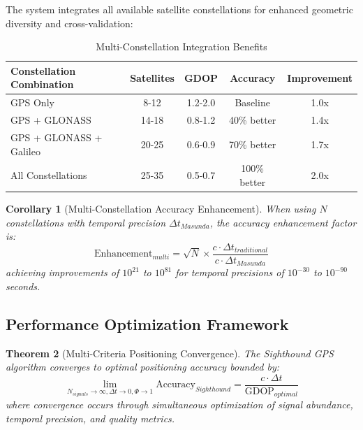 \documentclass[12pt,a4paper]{article}
\newtheorem{theorem}{Theorem}[section]
\newtheorem{corollary}[theorem]{Corollary}
\begin{document}
The system integrates all available satellite constellations for enhanced geometric diversity and cross-validation:

\begin{table}[htbp]
\centering
\caption{Multi-Constellation Integration Benefits}
\begin{tabular}{@{}lcccc@{}}
\toprule
\textbf{Constellation Combination} & \textbf{Satellites} & \textbf{GDOP} & \textbf{Accuracy} & \textbf{Improvement} \\
\midrule
GPS Only & 8-12 & 1.2-2.0 & Baseline & 1.0x \\
GPS + GLONASS & 14-18 & 0.8-1.2 & 40\% better & 1.4x \\
GPS + GLONASS + Galileo & 20-25 & 0.6-0.9 & 70\% better & 1.7x \\
All Constellations & 25-35 & 0.5-0.7 & 100\% better & 2.0x \\
\bottomrule
\end{tabular}
\end{table}

\begin{corollary}[Multi-Constellation Accuracy Enhancement]
When using $N$ constellations with temporal precision $\Delta t_{Masunda}$, the accuracy enhancement factor is:
\begin{equation}
\text{Enhancement}_{multi} = \sqrt{N} \times \frac{c \cdot \Delta t_{traditional}}{c \cdot \Delta t_{Masunda}}
\end{equation}
achieving improvements of $10^{21}$ to $10^{81}$ for temporal precisions of $10^{-30}$ to $10^{-90}$ seconds.
\end{corollary}


\subsection{Performance Optimization Framework}

\begin{theorem}[Multi-Criteria Positioning Convergence]
The Sighthound GPS algorithm converges to optimal positioning accuracy bounded by:
\begin{equation}
\lim_{N_{signals} \to \infty, \Delta t \to 0, \Phi \to 1} \text{Accuracy}_{Sighthound} = \frac{c \cdot \Delta t}{\text{GDOP}_{optimal}}
\end{equation}
where convergence occurs through simultaneous optimization of signal abundance, temporal precision, and quality metrics.
\end{theorem}
\end{document}
